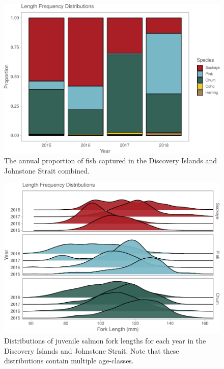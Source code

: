 \documentclass[fleqn,10pt]{wlpeerj} %
\begin{document}
\begin{figure}[H]
\includegraphics[width=0.9\linewidth]{Migration_Observations_Report_files/figure-latex/prop-1} \caption{The annual proportion of fish captured in the Discovery Islands and Johnstone Strait combined.}\label{fig:prop}
\end{figure}

\begin{figure}[H]
\includegraphics[width=0.9\linewidth]{Migration_Observations_Report_files/figure-latex/lengthplot-1} \caption{Distributions of juvenile salmon fork lengths for each year in the Discovery Islands and Johnstone Strait. Note that these distributions contain multiple age-classes.}\label{fig:lengthplot}
\end{figure}
\end{document}
